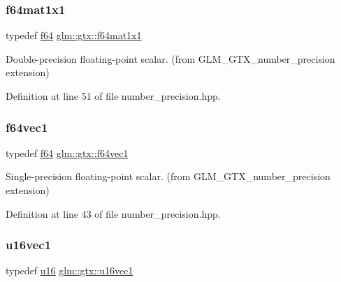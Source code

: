 \subsubsection{\texorpdfstring{f64mat1x1}{f64mat1x1}}
{\footnotesize\ttfamily typedef \mbox{\hyperlink{group__gtc__type__precision_ga2bba392e555124b36cde6abba349bab3}{f64}} \mbox{\hyperlink{group__gtx__number__precision_ga710a5952d78b22635c71c5fc2c0a3319}{glm\+::gtx\+::f64mat1x1}}}



Double-\/precision floating-\/point scalar. (from G\+L\+M\+\_\+\+G\+T\+X\+\_\+number\+\_\+precision extension) 



Definition at line 51 of file number\+\_\+precision.\+hpp.

\mbox{\label{group__gtx__number__precision_ga44336a26c958d66efdfb5a6c114c538e}} 
\subsubsection{\texorpdfstring{f64vec1}{f64vec1}}
{\footnotesize\ttfamily typedef \mbox{\hyperlink{group__gtc__type__precision_ga2bba392e555124b36cde6abba349bab3}{f64}} \mbox{\hyperlink{group__gtx__number__precision_ga44336a26c958d66efdfb5a6c114c538e}{glm\+::gtx\+::f64vec1}}}



Single-\/precision floating-\/point scalar. (from G\+L\+M\+\_\+\+G\+T\+X\+\_\+number\+\_\+precision extension) 



Definition at line 43 of file number\+\_\+precision.\+hpp.

\mbox{\label{group__gtx__number__precision_ga807d7e5f24e981b1575bd40ca159781d}} 
\subsubsection{\texorpdfstring{u16vec1}{u16vec1}}
{\footnotesize\ttfamily typedef \mbox{\hyperlink{group__gtc__type__precision_gae7a1571503f83d2264ddfa705a6b082a}{u16}} \mbox{\hyperlink{group__gtx__number__precision_ga807d7e5f24e981b1575bd40ca159781d}{glm\+::gtx\+::u16vec1}}}



